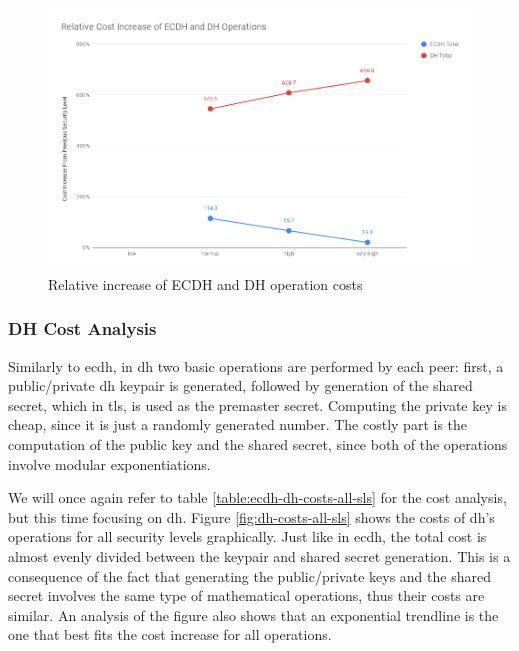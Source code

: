 \documentclass{llncs}
\begin{document}
  \begin{figure}
    \centering
    \includegraphics[width=1.0\textwidth]{img/ecdh_dh_relative_cost_increase.png}
    \centering \caption{\label{fig:ecdh-dh-relative-cost-increase} Relative increase of ECDH and DH operation costs}
  \end{figure}

\subsubsection{DH Cost Analysis}

Similarly to \gls{ecdh}, in \gls{dh} two basic operations are performed by each peer: first, a public/private \gls{dh} keypair is generated, followed
by generation of the shared secret, which in \gls{tls}, is used as the premaster secret. Computing the private key is cheap, since it is just a randomly
generated number. The costly part is the computation of the public key and the shared secret, since both of the operations involve modular exponentiations.

We will once again refer to table \ref{table:ecdh-dh-costs-all-sls} for the cost analysis, but this time focusing on \gls{dh}. Figure
\ref{fig:dh-costs-all-sls} shows the costs of \gls{dh}'s operations for all security levels graphically. Just like in \gls{ecdh}, the total cost
is almost evenly divided between the keypair and shared secret generation. This is a consequence of the fact that generating the public/private keys
and the shared secret involves the same type of mathematical operations, thus their costs are similar. An analysis of the figure
also shows that an exponential trendline is the one that best fits the cost increase for all operations.
\end{document}
